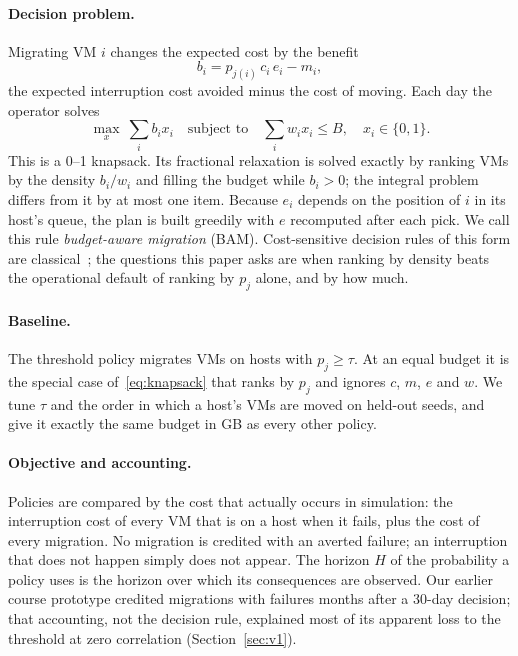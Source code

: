 \paragraph{Decision problem.}
Migrating VM $i$ changes the expected cost by the benefit
\begin{equation}
  b_i = p_{j(i)}\, c_i\, e_i - m_i ,
  \label{eq:benefit}
\end{equation}
the expected interruption cost avoided minus the cost of moving. Each day the operator solves
\begin{equation}
  \max_{x}\ \sum_i b_i x_i
  \quad \text{subject to} \quad \sum_i w_i x_i \le B,\quad x_i \in \{0,1\}.
  \label{eq:knapsack}
\end{equation}
This is a 0--1 knapsack. Its fractional relaxation is solved exactly by ranking VMs by the
density $b_i / w_i$ and filling the budget while $b_i > 0$; the integral problem differs from it
by at most one item. Because $e_i$ depends on the position of $i$ in its host's queue, the plan
is built greedily with $e$ recomputed after each pick. We call this rule \emph{budget-aware
migration} (BAM). Cost-sensitive decision rules of this form are classical~\cite{elkan2001foundations};
the questions this paper asks are when ranking by density beats the operational default of
ranking by $p_j$ alone, and by how much.

\paragraph{Baseline.}
The threshold policy migrates VMs on hosts with $p_j \ge \tau$. At an equal budget it is the
special case of~\eqref{eq:knapsack} that ranks by $p_j$ and ignores $c$, $m$, $e$ and $w$. We
tune $\tau$ and the order in which a host's VMs are moved on held-out seeds, and give it exactly
the same budget in GB as every other policy.

\paragraph{Objective and accounting.}
Policies are compared by the cost that actually occurs in simulation: the interruption cost of
every VM that is on a host when it fails, plus the cost of every migration. No migration is
credited with an averted failure; an interruption that does not happen simply does not appear.
The horizon $H$ of the probability a policy uses is the horizon over which its consequences are
observed. Our earlier course prototype credited migrations with failures months after a 30-day
decision; that accounting, not the decision rule, explained most of its apparent loss to the
threshold at zero correlation (Section~\ref{sec:v1}).

